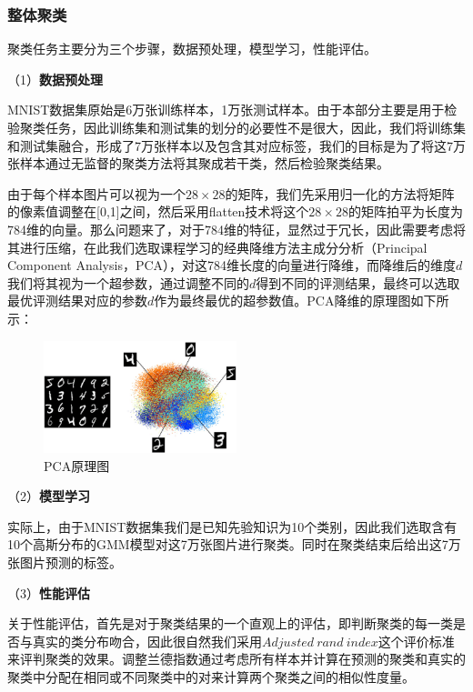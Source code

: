 \documentclass[UTF8]{ctexart}
\begin{document}
\subsubsection{整体聚类}

聚类任务主要分为三个步骤，数据预处理，模型学习，性能评估。

（1）\textbf{数据预处理}

MNIST数据集原始是6万张训练样本，1万张测试样本。由于本部分主要是用于检验聚类任务，因此训练集和测试集的划分的必要性不是很大，因此，我们将训练集和测试集融合，形成了7万张样本以及包含其对应标签，我们的目标是为了将这7万张样本通过无监督的聚类方法将其聚成若干类，然后检验聚类结果。

由于每个样本图片可以视为一个$28 \times 28$的矩阵，我们先采用归一化的方法将矩阵的像素值调整在[0,1]之间，然后采用flatten技术将这个$28 \times 28$的矩阵拍平为长度为784维的向量。那么问题来了，对于784维的特征，显然过于冗长，因此需要考虑将其进行压缩，在此我们选取课程学习的经典降维方法主成分分析（Principal Component Analysis，PCA），对这784维长度的向量进行降维，而降维后的维度$d$我们将其视为一个超参数，通过调整不同的$d$得到不同的评测结果，最终可以选取最优评测结果对应的参数$d$作为最终最优的超参数值。PCA降维的原理图如下所示：

\begin{figure}[!h]
  \includegraphics[width=0.5\textwidth]{./figures/PCA_mnist.png}
  \centering
  \caption{PCA原理图}
  \label{PCA-model}
\end{figure}


（2）\textbf{模型学习}

实际上，由于MNIST数据集我们是已知先验知识为10个类别，因此我们选取含有10个高斯分布的GMM模型对这7万张图片进行聚类。同时在聚类结束后给出这7万张图片预测的标签。

（3）\textbf{性能评估}

关于性能评估，首先是对于聚类结果的一个直观上的评估，即判断聚类的每一类是否与真实的类分布吻合，因此很自然我们采用$Adjusted~rand~index$这个评价标准来评判聚类的效果。调整兰德指数通过考虑所有样本并计算在预测的聚类和真实的聚类中分配在相同或不同聚类中的对来计算两个聚类之间的相似性度量。
\end{document}
